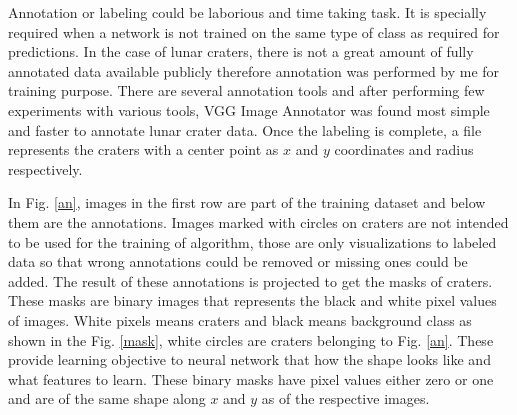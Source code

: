 \documentclass[11pt]{article}
\begin{document}
Annotation or labeling could be laborious and time taking task. It is specially required when a network is not trained on the same type of class as required for predictions. In the case of lunar craters, there is not a great amount of fully annotated data available publicly therefore annotation was performed by me for training purpose. There are several annotation tools and after performing few experiments with various tools, VGG Image Annotator was found most simple and faster to annotate lunar crater data. Once the labeling is complete, a file represents the craters with a center point as $x$ and $y$ coordinates and radius respectively.

In Fig. \ref{an}, images in the first row are part of the training dataset and below them are the annotations. Images marked with circles on craters are not intended to be used for the training of algorithm, those are only visualizations to labeled data so that wrong annotations could be removed or missing ones could be added. The result of these annotations is projected to get the masks of craters. These masks are binary images that represents the black and white pixel values of images. White pixels means craters and black means background class as shown in the Fig. \ref{mask}, white circles are craters belonging to Fig. \ref{an}. These provide learning objective to neural network that how the shape looks like and what features to learn. These binary masks have pixel values either zero or one and are of the same shape along $x$ and $y$ as of the respective images.
\end{document}

